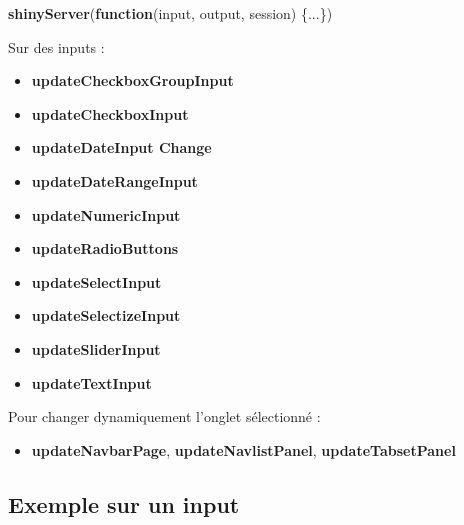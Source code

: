 \documentclass[
]{article}
\newenvironment{Shaded}{\begin{snugshade}}{\end{snugshade}}
\newcommand{\ControlFlowTok}[1]{\textcolor[rgb]{0.13,0.29,0.53}{\textbf{#1}}}
\newcommand{\FunctionTok}[1]{\textcolor[rgb]{0.13,0.29,0.53}{\textbf{#1}}}
\newcommand{\NormalTok}[1]{#1}
\providecommand{\tightlist}{%
  \setlength{\itemsep}{0pt}\setlength{\parskip}{0pt}}
\begin{document}
\begin{Shaded}
\begin{Highlighting}[]
\FunctionTok{shinyServer}\NormalTok{(}\ControlFlowTok{function}\NormalTok{(input, output, session) \{...\})}
\end{Highlighting}
\end{Shaded}

Sur des inputs :

\begin{itemize}
\tightlist
\item
  \textbf{updateCheckboxGroupInput}
\item
  \textbf{updateCheckboxInput}
\item
  \textbf{updateDateInput Change}
\item
  \textbf{updateDateRangeInput}
\item
  \textbf{updateNumericInput}
\item
  \textbf{updateRadioButtons}
\item
  \textbf{updateSelectInput}
\item
  \textbf{updateSelectizeInput}
\item
  \textbf{updateSliderInput}
\item
  \textbf{updateTextInput}
\end{itemize}

Pour changer dynamiquement l'onglet sélectionné :

\begin{itemize}
\tightlist
\item
  \textbf{updateNavbarPage}, \textbf{updateNavlistPanel},
  \textbf{updateTabsetPanel}
\end{itemize}

\hypertarget{exemple-sur-un-input}{%
\subsection{Exemple sur un input}\label{exemple-sur-un-input}}
\end{document}
